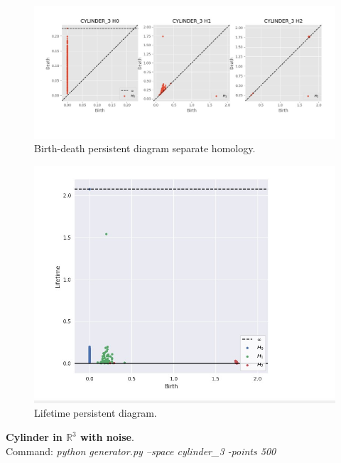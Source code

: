 \documentclass[11pt,a4paper]{report}
\begin{document}
              \begin{figure}[H]
                \centering
                \includegraphics[width=\linewidth]{./ripser/on_cylinder_pers_homology_sep.jpg}
                \caption{Birth-death persistent diagram separate homology.}
                \label{fig:sep hom}
              \end{figure}

              \begin{figure}[H]
                \centering
                \includegraphics[width=0.5\linewidth, scale=0.5]{./ripser/on_cylinder_lifetime.jpg}
                \caption{Lifetime persistent diagram.}
                \label{fig:sep hom}
              \end{figure}


              \textbf{Cylinder in $\mathbb{R}^3$ with noise}.\\
              Command: \textit{python generator.py --space cylinder\_3 -points 500}
\end{document}
